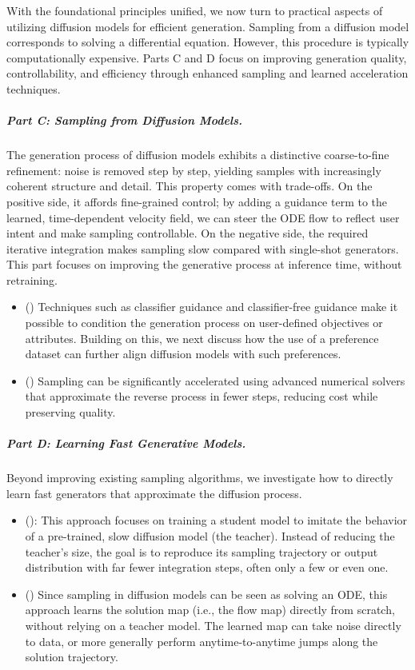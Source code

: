 With the foundational principles unified, we now turn to practical aspects of utilizing diffusion models for efficient generation. Sampling from a diffusion model corresponds to solving a differential equation. However, this procedure is typically computationally expensive. Parts C and D focus on improving generation quality, controllability, and efficiency through enhanced sampling and learned acceleration techniques.



\subparagraph{Part C: Sampling from Diffusion Models.} The generation process of diffusion models exhibits a distinctive coarse-to-fine refinement: noise is removed step by step, yielding samples with increasingly coherent structure and detail. This property comes with trade-offs. On the positive side, it affords fine-grained control; by adding a guidance term to the learned, time-dependent velocity field, we can steer the ODE flow to reflect user intent and make sampling controllable. On the negative side, the required iterative integration makes sampling slow compared with single-shot generators.
This part focuses on improving the generative process at inference time, without retraining.
\begin{itemize}
    \item {} ()\textbfs{:} Techniques such as classifier guidance and classifier-free guidance make it possible to condition the generation process on user-defined objectives or attributes. Building on this, we next discuss how the use of a preference dataset can further align diffusion models with such preferences.
    \item {} ()\textbfs{:} Sampling can be significantly accelerated using advanced numerical solvers that approximate the reverse process in fewer steps, reducing cost while preserving quality.
\end{itemize}
\subparagraph{Part D: Learning Fast Generative Models.} Beyond improving existing sampling algorithms, we investigate how to directly learn fast generators that approximate the diffusion process.
\begin{itemize}
    \item {} ():  This approach focuses on training a student model to imitate the behavior of a pre-trained, slow diffusion model (the teacher). Instead of reducing the teacher’s size, the goal is to reproduce its sampling trajectory or output distribution with far fewer integration steps, often only a few or even one.
    \item {} ()\textbfs{:} Since sampling in diffusion models can be seen as solving an ODE, this approach learns the solution map (i.e., the flow map) directly from scratch, without relying on a teacher model. The learned map can take noise directly to data, or more generally perform anytime-to-anytime jumps along the solution trajectory.
\end{itemize}


